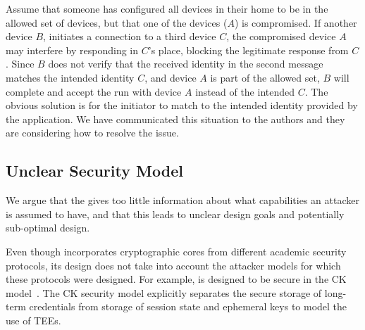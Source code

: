 \documentclass[runningheads, envcountsame, hidelinks, a4paper, draft, x11names]{llncs}
\begin{document}
Assume that someone has configured all devices in their home to be in the
allowed set of devices, but that one of the devices ($A$) is compromised.
%
If another device $B$, initiates a connection to a third device $C$, the
compromised device $A$ may interfere by responding in $C$'s place, blocking
the legitimate response from $C$.
%
Since $B$ does not verify that the received identity in the second message
matches the intended identity $C$, and device $A$ is part of the allowed set,
$B$ will complete and accept the \mEdhoc{} run with device $A$ instead of the
intended $C$.
%
The obvious solution is for the initiator to match \mIdcredr{} to the intended
identity provided by the application.
%
We have communicated this situation to the \mEdhoc{} authors and they are considering
how to resolve the issue.
%

\subsection{Unclear Security Model}
%
We argue that the \mSpec{} gives too little information about what capabilities
an attacker is assumed to have, and that this leads to unclear design goals and
potentially sub-optimal design.
%
%

%
Even though \mEdhoc{} incorporates cryptographic cores from different academic
security protocols, its design does not take into account the attacker models
for which these protocols were designed.
%
For example, \mOptls{} is designed to be secure in the CK
model~\cite{DBLP:conf/crypto/CanettiK02}.
%
The CK security model explicitly separates the secure storage of long-term
credentials from storage of session state and ephemeral keys to model the 
use of TEEs.
%
\end{document}
